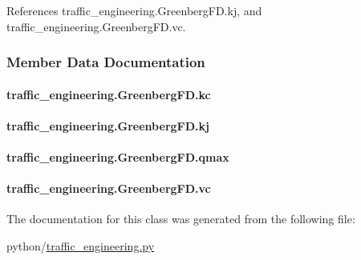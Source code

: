 References traffic\-\_\-engineering.\-Greenberg\-F\-D.\-kj, and traffic\-\_\-engineering.\-Greenberg\-F\-D.\-vc.



\subsubsection{Member Data Documentation}
\hypertarget{classtraffic__engineering_1_1GreenbergFD_ae1655c5902b4a0a052076c1f3cf9815f}{
\paragraph[{kc}]{\setlength{\rightskip}{0pt plus 5cm}traffic\-\_\-engineering.\-Greenberg\-F\-D.\-kc}}\label{classtraffic__engineering_1_1GreenbergFD_ae1655c5902b4a0a052076c1f3cf9815f}
\hypertarget{classtraffic__engineering_1_1GreenbergFD_ac4c696e59088247b4ede81c4d89e9175}{
\paragraph[{kj}]{\setlength{\rightskip}{0pt plus 5cm}traffic\-\_\-engineering.\-Greenberg\-F\-D.\-kj}}\label{classtraffic__engineering_1_1GreenbergFD_ac4c696e59088247b4ede81c4d89e9175}
\hypertarget{classtraffic__engineering_1_1GreenbergFD_ae75ead70e12104991e35ac8e81c9257e}{
\paragraph[{qmax}]{\setlength{\rightskip}{0pt plus 5cm}traffic\-\_\-engineering.\-Greenberg\-F\-D.\-qmax}}\label{classtraffic__engineering_1_1GreenbergFD_ae75ead70e12104991e35ac8e81c9257e}
\hypertarget{classtraffic__engineering_1_1GreenbergFD_a7134c8a55120d951b112818fe9724285}{
\paragraph[{vc}]{\setlength{\rightskip}{0pt plus 5cm}traffic\-\_\-engineering.\-Greenberg\-F\-D.\-vc}}\label{classtraffic__engineering_1_1GreenbergFD_a7134c8a55120d951b112818fe9724285}


The documentation for this class was generated from the following file\-:\begin{DoxyCompactItemize}
\item 
python/\hyperlink{traffic__engineering_8py}{traffic\-\_\-engineering.\-py}\end{DoxyCompactItemize}
